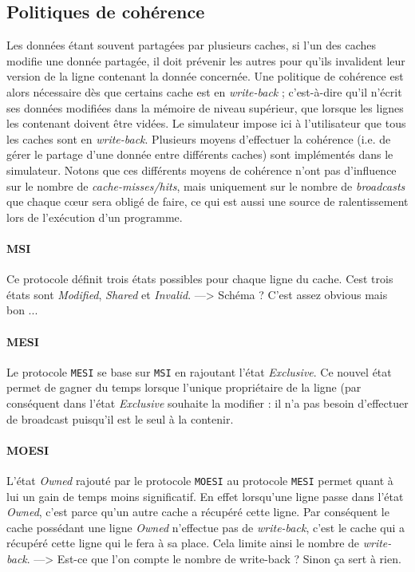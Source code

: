 \subsection{Politiques de cohérence}

Les données étant souvent partagées par plusieurs caches, si l'un des caches modifie une donnée partagée, il doit prévenir les autres pour qu'ils invalident leur version de la ligne contenant la donnée concernée. Une politique de cohérence est alors nécessaire dès  que certains cache est en \emph{write-back} ; c'est-à-dire qu'il n'écrit ses données modifiées dans la mémoire de niveau supérieur, que lorsque les lignes les contenant doivent être vidées. Le simulateur impose ici à l'utilisateur que tous les caches sont en \emph{write-back}.
Plusieurs moyens d'effectuer la cohérence (i.e. de gérer le partage d'une donnée entre différents caches) sont implémentés dans le simulateur. Notons que ces différents moyens de cohérence n'ont pas d'influence sur le nombre de \emph{cache-misses/hits}, mais uniquement sur le nombre de \emph{broadcasts} que chaque c\oe ur sera obligé de faire, ce qui est aussi une source de ralentissement lors de l'exécution d'un programme. 

\paragraph{MSI} Ce protocole définit trois états possibles pour chaque ligne du cache. Cest trois états sont \emph{Modified}, \emph{Shared} et \emph{Invalid}. ---> Schéma ? C'est assez obvious mais bon ...

\paragraph{MESI} Le protocole \texttt{MESI} se base sur \texttt{MSI} en rajoutant l'état \emph{Exclusive}. Ce nouvel état permet de gagner du temps lorsque l'unique propriétaire de la ligne (par conséquent dans l'état \emph{Exclusive} souhaite la modifier : il n'a pas besoin d'effectuer de broadcast puisqu'il est le seul à la contenir.

\paragraph{MOESI} L'état \emph{Owned} rajouté par le protocole \texttt{MOESI} au protocole \texttt{MESI} permet quant à lui un gain de temps moins significatif. En effet lorsqu'une ligne passe dans l'état \emph{Owned}, c'est parce qu'un autre cache a récupéré cette ligne. Par conséquent le cache possédant une ligne \emph{Owned} n'effectue pas de \emph{write-back}, c'est le cache qui a récupéré cette ligne qui le fera à sa place. Cela limite ainsi le nombre de \emph{write-back}.  ---> Est-ce que l'on compte le nombre de write-back ? Sinon ça sert à rien.


